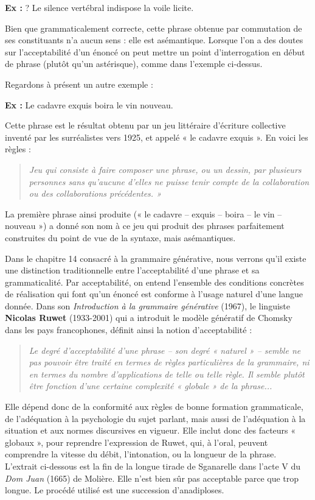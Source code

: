 \noindent\textbf{Ex :} ? Le silence vertébral indispose la voile licite.

Bien que grammaticalement correcte, cette phrase obtenue par commutation de ses constituants n’a aucun sens : elle est asémantique. Lorsque l’on a des doutes sur l’acceptabilité d’un énoncé on peut mettre un point d’interrogation en début de phrase (plutôt qu’un astérisque), comme dans l’exemple ci-dessus.

Regardons à présent un autre exemple :

\noindent\textbf{Ex :} Le cadavre exquis boira le vin nouveau.

Cette phrase est le résultat obtenu par un jeu littéraire d’écriture collective inventé par les surréalistes vers 1925, et appelé « le cadavre exquis ». En voici les règles :
\begin{quote}\small\itshape
Jeu qui consiste à faire composer une phrase, ou un dessin, par plusieurs personnes sans qu’aucune d’elles ne puisse tenir compte de la collaboration ou des collaborations précédentes. »
\end{quote}
La première phrase ainsi produite (« le cadavre – exquis – boira – le vin – nouveau ») a donné son nom à ce jeu qui produit des phrases parfaitement construites du point de vue de la syntaxe, mais asémantiques.

Dans le chapitre 14 consacré à la grammaire générative, nous verrons qu’il existe une distinction traditionnelle entre l’acceptabilité d’une phrase et sa grammaticalité. Par acceptabilité, on entend l’ensemble des conditions concrètes de réalisation qui font qu’un énoncé est conforme à l’usage naturel d’une langue donnée. Dans son \textit{Introduction à la grammaire générative} (1967), le linguiste \textbf{Nicolas Ruwet} (1933-2001) qui a introduit le modèle génératif de Chomsky dans les pays francophones, définit ainsi la notion d’acceptabilité :
\begin{quote}\small\itshape
Le degré d’acceptabilité d’une phrase – son degré « naturel » – semble ne pas pouvoir être traité en termes de règles particulières de la grammaire, ni en termes du nombre d’applications de telle ou telle règle. Il semble plutôt être fonction d’une certaine complexité « globale » de la phrase...
\end{quote}
Elle dépend donc de la conformité aux règles de bonne formation grammaticale, de l’adéquation à la psychologie du sujet parlant, mais aussi de l’adéquation à la situation et aux normes discursives en vigueur. Elle inclut donc des facteurs « globaux », pour reprendre l’expression de Ruwet, qui, à l’oral, peuvent comprendre la vitesse du débit, l’intonation, ou la longueur de la phrase. L’extrait ci-dessous est la fin de la longue tirade de Sganarelle dans l’acte V du \textit{Dom Juan} (1665) de Molière. Elle n’est bien sûr pas acceptable parce que trop longue. Le procédé utilisé est une succession d’anadiploses.

